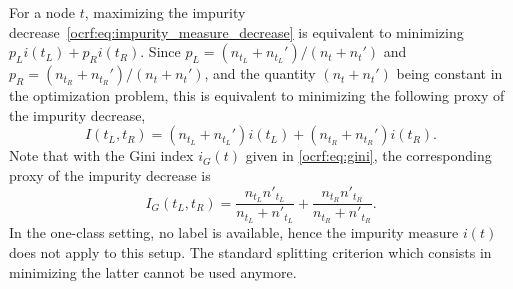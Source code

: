 For a node $t$, maximizing the impurity
decrease~\cref{ocrf:eq:impurity_measure_decrease} is equivalent to minimizing
$p_L i(t_L) + p_R i(t_R)$.  Since $p_L = (n_{t_L} + n_{t_L}') / (n_t + n_t')$
and $p_R = (n_{t_R} + n_{t_R}')/(n_t + n_t')$, and the quantity $(n_t + n_t')$
being constant in the optimization problem, this is equivalent to minimizing
the following proxy of the impurity decrease,
\begin{dmath}
    \label{ocrf:eq:two_class_proxy}
    I(t_L, t_R) =   (n_{t_L} + n_{t_L}') i(t_L) + (n_{t_R} + n_{t_R}') i(t_R).
\end{dmath}
Note that with the Gini index $i_G(t)$ given in \cref{ocrf:eq:gini}, the
corresponding proxy of the impurity decrease is
\begin{dmath}
    \label{ocrf:tc_proxy}
    I_G(t_L, t_R)= \frac{n_{t_L} n'_{t_L}}{n_{t_L} +  n'_{t_L}} + \frac{n_{t_R}
    n'_{t_R}}{n_{t_R} +  n'_{t_R}}.
\end{dmath}
%
In the one-class setting, no label is available, hence the impurity measure
$i(t)$
does not apply to this setup. The standard splitting criterion which consists
in minimizing the latter cannot be used anymore.




